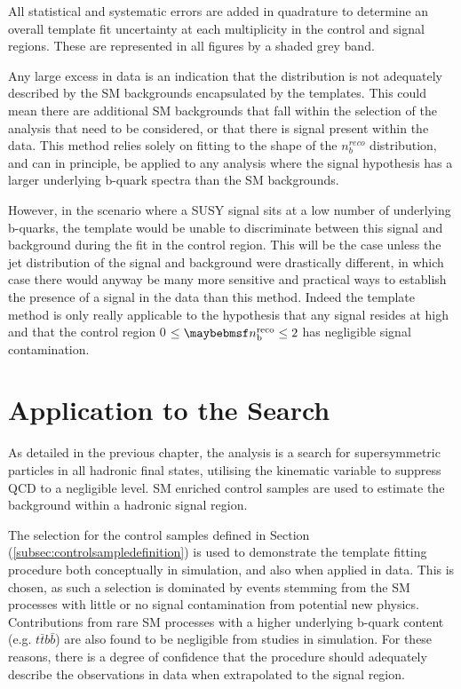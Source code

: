 All statistical and systematic errors are added in quadrature to determine an overall template fit uncertainty at each \nbreco multiplicity in the control and signal regions. These are represented in all figures by a shaded grey band. 

Any large excess in data is an indication that the \nbreco distribution is not adequately described by the \ac{SM} backgrounds encapsulated by the templates. This could mean there are additional \ac{SM} backgrounds that fall within the selection of the analysis that need to be considered, or that there is signal present within the data. This method relies solely on fitting to the shape of the $n_{b}^{reco}$ distribution, and can in principle, be applied to any analysis where the signal hypothesis has a larger underlying b-quark spectra than the \ac{SM} backgrounds. 

However, in the scenario where a \ac{SUSY} signal sits at a low number of underlying b-quarks, the template would be unable to discriminate between this signal and background during the fit in the control region. This will be the case unless the jet \pt distribution of the signal and background were drastically different, in which case there would anyway be many more sensitive and practical ways to establish the presence of a signal in the data than this method. Indeed the template method is only really applicable to the hypothesis that any signal resides at high \nbreco and that the control region 0 $\leq \nbreco \leq 2$ has negligible signal contamination.  

\FloatBarrier
\section{ Application to the \alphat Search}
\label{sec:templateapplication}

As detailed in the previous chapter, the \alphat analysis is a search for supersymmetric particles in all hadronic final states, utilising the kinematic variable \alphat to suppress QCD to a negligible level. \ac{SM} enriched control samples are used to estimate the background within a hadronic signal region. 

The selection for the \mupjets control samples defined in Section (\ref{subsec:controlsampledefinition}) is used to demonstrate the template fitting procedure both conceptually in simulation, and also when applied in data. This is chosen, as such a selection is dominated by events stemming from the \ac{SM} processes with little or no signal contamination from potential new physics. Contributions from rare \ac{SM} processes with a higher underlying b-quark content (e.g. $t\bar{t}b\bar{b}$) are also found to be negligible from studies in simulation. For these reasons, there is a degree of confidence that the procedure should adequately describe the observations in data when extrapolated to the signal region.

